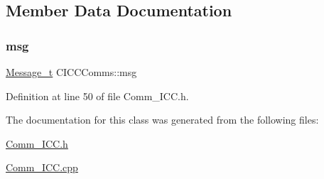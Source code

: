 \subsection{Member Data Documentation}
\mbox{\label{class_c_i_c_c_comms_a35a59d11110d830b70ab5e2a5644bbb9}} 
\subsubsection{\texorpdfstring{msg}{msg}}
{\footnotesize\ttfamily \mbox{\hyperlink{struct_c_i_c_c_comms_1_1_message__t}{Message\+\_\+t}} C\+I\+C\+C\+Comms\+::msg}



Definition at line 50 of file Comm\+\_\+\+I\+C\+C.\+h.



The documentation for this class was generated from the following files\+:\begin{DoxyCompactItemize}
\item 
\mbox{\hyperlink{_comm___i_c_c_8h}{Comm\+\_\+\+I\+C\+C.\+h}}\item 
\mbox{\hyperlink{_comm___i_c_c_8cpp}{Comm\+\_\+\+I\+C\+C.\+cpp}}\end{DoxyCompactItemize}
